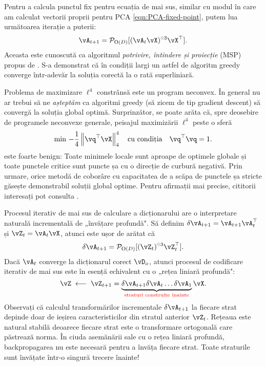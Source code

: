 \documentclass[../../book-main_ro.tex]{subfiles}
\begin{document}
Pentru a calcula punctul fix pentru ecuația de mai sus, similar cu modul în care am calculat
vectorii proprii pentru PCA \eqref{eqn:PCA-fixed-point}, putem lua următoarea
iterație a puterii:
\begin{equation}\label{eq:msp_iteration}
    \vA_{t+1} = \mathcal{P}_{\mathrm O(D)}[( {\vA_t \vX})^{\hada 3}\vX^\top].
\end{equation}
Aceasta este cunoscută ca algoritmul {\em potrivire, întindere și proiecție} (MSP) propus de \cite{Zhai-2020}. S-a demonstrat că în condiții largi un astfel de algoritm greedy converge într-adevăr la soluția corectă la o rată superliniară.

\begin{remark}\label{rem:L4-global}
Problema de maximizare $\ell^4$ constrânsă este un program neconvex. În general nu ar trebui să ne \textit{așteptăm} ca algoritmi greedy (să zicem de tip gradient descent) să convergă la soluția global optimă. Surprinzător, se poate arăta că, spre deosebire de programele neconvexe generale, peisajul maximizării $\ell^4$ peste o sferă
\begin{equation}\label{eq:l4-maximization-sphere}
    \min\,
    -   \frac{1}{4} \norm*{
    \vq^\top \vX
    }_4^4 \quad \mbox{cu condiția} \quad  \vq^\top\vq = 1.
\end{equation}
este foarte benign: Toate minimele locale sunt aproape de optimele globale și toate punctele critice sunt puncte șa cu o direcție de curbură negativă. Prin urmare, orice metodă de coborâre cu capacitatea de a scăpa de punctele șa stricte găsește demonstrabil soluții global optime. Pentru afirmații mai precise, cititorii interesați pot consulta \cite{Qu2020Geometric}. 
\end{remark}

\begin{remark}
Procesul iterativ de mai sus de calculare a dicționarului are o interpretare naturală incrementală de „învățare profundă". Să definim 
$\delta \vA_{t+1} = \vA_{t+1}\vA_{t}^\top$ și $\vZ_t = \vA_t \vX$, atunci este ușor de arătat că
$$\delta \vA_{t+1} = \mathcal{P}_{\mathrm O(D)}[(\vZ_t)^{\hada 3} \vZ_t^\top].$$ 
Dacă $\vA_t$ converge la dicționarul corect $\vD_o$, atunci procesul de codificare iterativ de mai sus este în esență echivalent cu o „rețea liniară profundă": 
$$\vZ \; \longleftarrow \; \vZ_{t+1} =  \underbrace{\delta \vA_{t+1} \delta \vA_{t} \ldots \delta \vA_{1}}_{\color{red} \text{straturi construite înainte}} \vX.$$
Observați că calculul transformărilor incrementale $\delta \vA_{t+1}$ la fiecare strat depinde doar de ieșirea caracteristicilor din stratul anterior $\vZ_t$. Rețeaua este natural stabilă deoarece fiecare strat este o transformare ortogonală care păstrează norma. În ciuda asemănării sale cu o rețea liniară profundă, backpropagarea nu este necesară pentru a învăța fiecare strat. Toate straturile sunt învățate într-o singură trecere înainte!
\end{remark}
\end{document}
